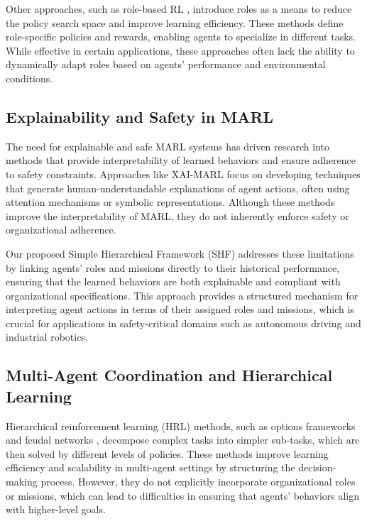 \documentclass[sigconf,anonymous]{aamas}
\begin{document}
Other approaches, such as role-based RL \cite{role_based_rl_reference}, introduce roles as a means to reduce the policy search space and improve learning efficiency. These methods define role-specific policies and rewards, enabling agents to specialize in different tasks. While effective in certain applications, these approaches often lack the ability to dynamically adapt roles based on agents' performance and environmental conditions.

\subsection{Explainability and Safety in MARL}
The need for explainable and safe MARL systems has driven research into methods that provide interpretability of learned behaviors and ensure adherence to safety constraints. Approaches like XAI-MARL \cite{xai_marl_reference} focus on developing techniques that generate human-understandable explanations of agent actions, often using attention mechanisms or symbolic representations. Although these methods improve the interpretability of MARL, they do not inherently enforce safety or organizational adherence.

Our proposed Simple Hierarchical Framework (SHF) addresses these limitations by linking agents' roles and missions directly to their historical performance, ensuring that the learned behaviors are both explainable and compliant with organizational specifications. This approach provides a structured mechanism for interpreting agent actions in terms of their assigned roles and missions, which is crucial for applications in safety-critical domains such as autonomous driving and industrial robotics.

\subsection{Multi-Agent Coordination and Hierarchical Learning}
Hierarchical reinforcement learning (HRL) methods, such as options frameworks \cite{options_hrl_reference} and feudal networks \cite{feudal_rl_reference}, decompose complex tasks into simpler sub-tasks, which are then solved by different levels of policies. These methods improve learning efficiency and scalability in multi-agent settings by structuring the decision-making process. However, they do not explicitly incorporate organizational roles or missions, which can lead to difficulties in ensuring that agents' behaviors align with higher-level goals.
\end{document}
